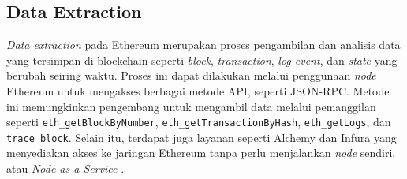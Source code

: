 \subsection{Data Extraction}
\label{subsec:data-extraction}

\textit{Data extraction} pada Ethereum merupakan proses pengambilan dan analisis data yang tersimpan di blockchain seperti \textit{block}, \textit{transaction}, \textit{log event}, dan \textit{state} yang berubah seiring waktu. Proses ini dapat dilakukan melalui penggunaan \textit{node} Ethereum untuk mengakses berbagai metode API, seperti JSON-RPC. Metode ini memungkinkan pengembang untuk mengambil data melalui pemanggilan seperti \texttt{eth\_getBlockByNumber}, \texttt{eth\_getTransactionByHash}, \texttt{eth\_getLogs}, dan \texttt{trace\_block}. Selain itu, terdapat juga layanan seperti Alchemy dan Infura yang menyediakan akses ke jaringan Ethereum tanpa perlu menjalankan \textit{node} sendiri, atau \textit{Node-as-a-Service} \parencite{ethereum_jsonrpc}.